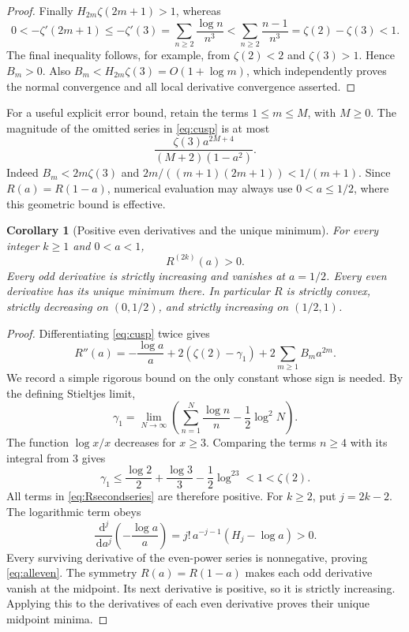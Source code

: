 \documentclass[11pt]{article}
\numberwithin{equation}{section}
\newtheorem{corollary}[theorem]{Corollary}
\theoremstyle{definition}\newtheorem{definition}[theorem]{Definition}
\theoremstyle{remark}\newtheorem{remark}[theorem]{Remark}
\newcommand{\dd}{\,\mathrm d}
\begin{document}
\begin{proof}
Finally $H_{2m}\zeta(2m+1)>1$, whereas
\[
 0<-\zeta'(2m+1)\le-\zeta'(3)
 =\sum_{n\ge2}\frac{\log n}{n^3}
 <\sum_{n\ge2}\frac{n-1}{n^3}=\zeta(2)-\zeta(3)<1.
\]
The final inequality follows, for example, from $\zeta(2)<2$ and
$\zeta(3)>1$. Hence $B_m>0$. Also
$B_m<H_{2m}\zeta(3)=O(1+\log m)$, which independently proves the
normal convergence and all local derivative convergence asserted.
\end{proof}

For a useful explicit error bound, retain the terms $1\le m\le M$, with
$M\ge0$. The magnitude of the omitted series in \eqref{eq:cusp} is at
most
\begin{equation}\label{eq:cusptail}
 \frac{\zeta(3)a^{2M+4}}{(M+2)(1-a^2)}.
\end{equation}
Indeed $B_m<2m\zeta(3)$ and
$2m/((m+1)(2m+1))<1/(m+1)$. Since $R(a)=R(1-a)$, numerical evaluation
may always use $0<a\le1/2$, where this geometric bound is effective.

\begin{corollary}[Positive even derivatives and the unique minimum]
\label{cor:convexity}
For every integer $k\ge1$ and $0<a<1$,
\begin{equation}\label{eq:alleven}
 R^{(2k)}(a)>0.
\end{equation}
Every odd derivative is strictly increasing and vanishes at $a=1/2$.
Every even derivative has its unique minimum there. In particular $R$
is strictly convex, strictly decreasing on $(0,1/2)$, and strictly
increasing on $(1/2,1)$.
\end{corollary}
\begin{proof}
Differentiating \eqref{eq:cusp} twice gives
\begin{equation}\label{eq:Rsecondseries}
 R''(a)=-\frac{\log a}{a}+2(\zeta(2)-\gamma_1)
                            +2\sum_{m\ge1}B_m a^{2m}.
\end{equation}
We record a simple rigorous bound on the only constant whose sign is
needed. By the defining Stieltjes limit,
\[
 \gamma_1=\lim_{N\to\infty}
 \left(\sum_{n=1}^N\frac{\log n}{n}-\frac12\log^2N\right).
\]
The function $\log x/x$ decreases for $x\ge3$. Comparing the terms
$n\ge4$ with its integral from $3$ gives
\[
 \gamma_1\le\frac{\log2}{2}+\frac{\log3}{3}
                 -\frac12\log^23<1<\zeta(2).
\]
All terms in \eqref{eq:Rsecondseries} are therefore positive.
For $k\ge2$, put $j=2k-2$. The logarithmic term obeys
\[
 \frac{\dd^j}{\dd a^j}\left(-\frac{\log a}{a}\right)
          =j!\,a^{-j-1}(H_j-\log a)>0.
\]
Every surviving derivative of the even-power series is nonnegative,
proving \eqref{eq:alleven}. The symmetry $R(a)=R(1-a)$ makes each odd
derivative vanish at the midpoint. Its next derivative is positive, so
it is strictly increasing. Applying this to the derivatives of each
even derivative proves their unique midpoint minima.
\end{proof}
\end{document}
